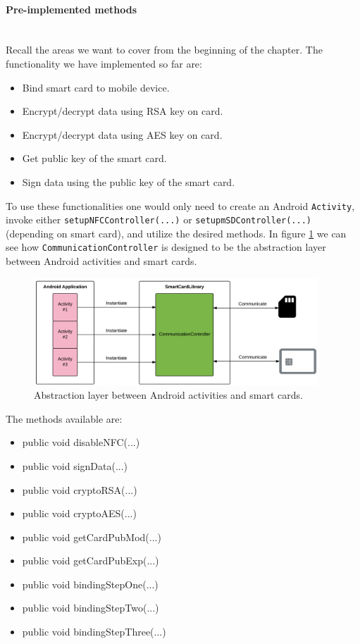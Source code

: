 \paragraph{Pre-implemented methods}\mbox{}\\
Recall the areas we want to cover from the beginning of the chapter. The functionality we have implemented so far are:

\begin{itemize}
    \item Bind smart card to mobile device.
    \item Encrypt/decrypt data using RSA key on card.
    \item Encrypt/decrypt data using AES key on card.
    \item Get public key of the smart card.
    \item Sign data using the public key of the smart card.
\end{itemize}

To use these functionalities one would only need to create an Android \texttt{Activity}, invoke either \texttt{setupNFCController(...)} or \texttt{setupmSDController(...)} (depending on smart card), and utilize the desired methods. In figure \ref{fig:instantiateflow} we can see how \texttt{CommunicationController} is designed to be the abstraction layer between Android activities and smart cards.


\begin{figure}[h!]
  \caption{Abstraction layer between Android activities and smart cards.}
  \label{fig:instantiateflow}
  \centering
    \includegraphics[width=0.95\textwidth]{images/Instantiate_flow.png}
\end{figure}

The methods available are:

\begin{itemize}
    \item public void disableNFC(...)
    \item public void signData(...)
    \item public void cryptoRSA(...)
    \item public void cryptoAES(...)
    \item public void getCardPubMod(...)
    \item public void getCardPubExp(...)
    \item public void bindingStepOne(...)
    \item public void bindingStepTwo(...)
    \item public void bindingStepThree(...)
\end{itemize}

